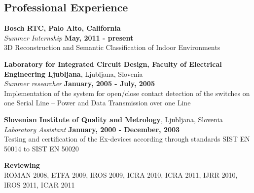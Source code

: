 \documentclass[margin,line]{res}
\begin{document}
\begin{resume}
\section{\sc Professional Experience}
{\bf Bosch RTC, Palo Alto, California}\\
{\em Summer Internship} \hfill {\bf May, 2011 - present}\\
3D Reconstruction and Semantic Classification of Indoor Environments

{\bf Laboratory for Integrated Circuit Design, Faculty of Electrical Engineering Ljubljana}, 
Ljubljana, Slovenia \\
{\em Summer researcher} \hfill {\bf January, 2005 - July, 2005}\\
Implementation of the system for open/close contact detection of the switches 
on one Serial Line -- Power and Data Transmission over one Line 

{\bf Slovenian Institute of Quality and Metrology}, Ljubljana, Slovenia \\
{\em Laboratory Assistant} \hfill {\bf January, 2000 - December, 2003}\\
Testing and certification of the Ex-devices according through standards SIST EN 50014 
to SIST EN 50020

{\bf Reviewing}\\
ROMAN 2008, ETFA 2009, IROS 2009, ICRA 2010, ICRA 2011, IJRR 2010, IROS 2011, ICAR 2011


\end{resume}
\end{document}
